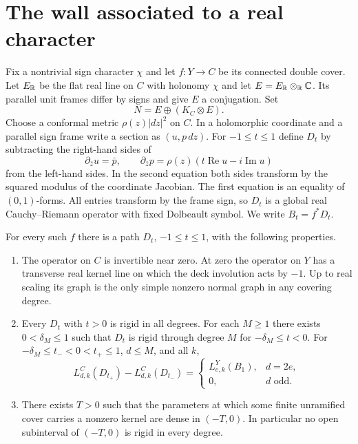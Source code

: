 \section{The wall associated to a real character}\label{sec:model}

Fix a nontrivial sign character $\chi$ and let $f:Y\to C$ be its connected double cover. Let $E_{\mathbb R}$ be the flat real line on $C$ with holonomy $\chi$ and
let $E=E_{\mathbb R}\otimes_{\mathbb R}\mathbb C$. Its parallel unit frames differ by
signs and give $E$ a conjugation. Set
\[
 N=E\oplus(K_C\otimes E).
\]
Choose a conformal metric $\rho(z)|dz|^2$ on $C$. In a holomorphic
coordinate and a parallel sign frame write a section as $(u,p\,dz)$.
For $-1\le t\le1$ define $D_t$ by subtracting the right-hand
sides of
\begin{equation}\label{eq:character-model}
 \partial_{\bar z}u=\bar p,\qquad
 \partial_{\bar z}p=\rho(z)(t\operatorname{Re}u-i\operatorname{Im}u)
\end{equation}
from the left-hand sides. In the second equation both sides transform
by the squared modulus of the coordinate Jacobian. The first equation
is an equality of $(0,1)$-forms. All entries transform by the frame
sign, so $D_t$ is a global real Cauchy--Riemann operator with fixed
Dolbeault symbol. We write $B_t=f^*D_t$.

\begin{theorem}\label{thm:character}
For every such $f$ there is a path $D_t$, $-1\le t\le1$, with the
following properties.
\begin{enumerate}
\item The operator on $C$ is invertible near zero. At zero the operator
on $Y$ has a transverse real kernel line on which the deck involution
acts by $-1$. Up to real scaling its graph is the only simple
nonzero normal graph in any covering degree.
\item Every $D_t$ with $t>0$ is rigid in all degrees. For each
$M\ge1$ there exists $0<\delta_M\le1$ such that $D_t$ is rigid
through degree $M$ for $-\delta_M\le t<0$. For
$-\delta_M\le t_-<0<t_+\le1$, $d\le M$, and all $k$,
\begin{equation}\label{eq:mainwall}
 L^C_{d,k}(D_{t_+})-L^C_{d,k}(D_{t_-})=
 \begin{cases}
  L^Y_{e,k}(B_1),&d=2e,\\
  0,&d\text{ odd}.
 \end{cases}
\end{equation}
\item There exists $T>0$ such that the parameters at which some
finite unramified cover carries a nonzero kernel are dense in $(-T,0)$.
In particular no open subinterval of $(-T,0)$ is rigid in every degree.
\end{enumerate}
\end{theorem}

